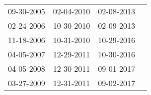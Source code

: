 \begin{supertabular}{llll}
 09-30-2005 &  02-04-2010 &  02-08-2013 \\
 02-24-2006 &  10-30-2010 &  02-09-2013 \\
 11-18-2006 &  10-31-2010 &  10-29-2016 \\
 04-05-2007 &  12-29-2011 &  10-30-2016 \\
 04-05-2008 &  12-30-2011 &  09-01-2017 \\
 03-27-2009 &  12-31-2011 &  09-02-2017 \\
\end{supertabular}
